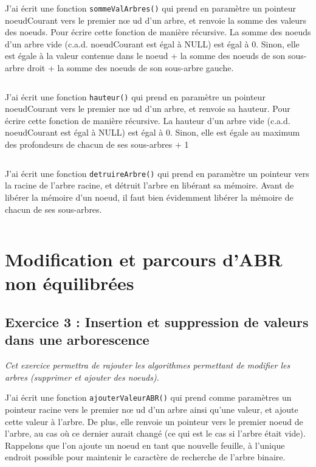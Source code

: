 J'ai écrit une fonction \texttt{sommeValArbres()} qui prend en paramètre un pointeur noeudCourant vers le premier nœ ud d’un arbre, et renvoie la somme des valeurs des noeuds. Pour écrire cette fonction de manière récursive. La somme des noeuds d’un arbre vide (c.a.d. noeudCourant est égal à NULL) est égal à 0. Sinon, elle est égale à la valeur contenue dans le noeud + la somme des noeuds de son sous-arbre droit + la somme des noeuds de son sous-arbre gauche.
\inputminted[linenos,firstline=26, lastline=38]{cpp}{../sources/cpp/TP3-4/arbresFctRecursives.c}

J'ai écrit une fonction \texttt{hauteur()} qui prend en paramètre un pointeur noeudCourant vers le premier nœ ud d’un arbre, et renvoie sa hauteur. Pour écrire cette fonction de manière récursive. La hauteur d’un arbre vide (c.a.d. noeudCourant est égal à NULL) est égal à 0. Sinon, elle est égale au maximum des profondeurs de chacun de ses sous-arbres + 1
\inputminted[linenos,firstline=40, lastline=50]{cpp}{../sources/cpp/TP3-4/arbresFctRecursives.c}

J'ai écrit une fonction \texttt{detruireArbre()} qui  prend en paramètre un pointeur vers la racine de l’arbre racine, et détruit l’arbre en libérant sa mémoire. Avant de libérer la mémoire d’un noeud, il faut bien évidemment libérer la mémoire de chacun de ses sous-arbres.
\inputminted[linenos,firstline=52, lastline=58]{cpp}{../sources/cpp/TP3-4/arbresFctRecursives.c}

\section{Modification et parcours d’ABR non équilibrées}

\subsection{Exercice 3 : Insertion et suppression de valeurs dans une arborescence}
\textit{Cet exercice permettra de rajouter les algorithmes permettant de modifier les arbres (supprimer et ajouter des noeuds).}

J'ai écrit une fonction \texttt{ajouterValeurABR()} qui prend comme paramètres un pointeur racine vers le premier nœ ud d’un arbre ainsi qu’une valeur, et ajoute cette valeur à l’arbre. De plus, elle renvoie un pointeur vers le premier noeud de l’arbre, au cas où ce dernier aurait changé (ce qui est le cas si l’arbre était vide). Rappelons que l’on ajoute un noeud en tant que nouvelle feuille, à l’unique endroit possible pour maintenir le caractère de recherche de l’arbre binaire.
\inputminted[linenos,firstline=8, lastline=19]{cpp}{../sources/cpp/TP3-4/modifArbres.c}

